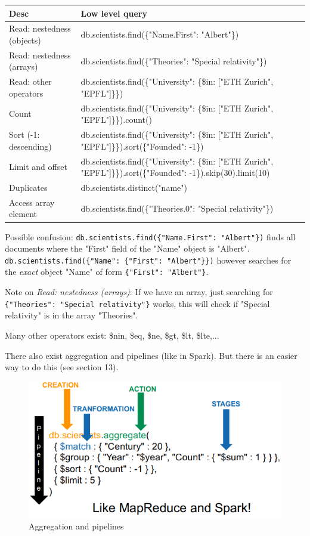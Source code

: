 \documentclass[11pt,oneside,a4paper]{article}
\begin{document}
\begin{table}[hb!]
\centering
\begin{tabular}{|p{40mm}|p{135mm}|}
	\hline 
	\textbf{Desc} & \textbf{Low level query} \\ 
	\hline 
	Read: nestedness (objects) & db.scientists.find(\{"Name.First": "Albert"\}) \\ 
	\hline 
	Read: nestedness (arrays) & db.scientists.find(\{"Theories": "Special relativity"\}) \\ 
	\hline 
	Read: other operators & db.scientists.find(\{"University": \{\$in: ["ETH Zurich", "EPFL"]\}\}) \\ 
	\hline 
	Count & db.scientists.find(\{"University": \{\$in: ["ETH Zurich", "EPFL"]\}\}).count() \\ 
	\hline 
	Sort (-1: descending) & db.scientists.find(\{"University": \{\$in: ["ETH Zurich", "EPFL"]\}\}).sort(\{"Founded": -1\}) \\ 
	\hline 
	Limit and offset & db.scientists.find(\{"University": \{\$in: ["ETH Zurich", "EPFL"]\}\}).sort(\{"Founded": -1\}).skip(30).limit(10) \\ 
	\hline 
	Duplicates & db.scientists.distinct("name") \\ 
	\hline 
	Access array element & db.scientists.find(\{"Theories.0": "Special relativity"\}) \\
	\hline
\end{tabular} 
\end{table}

Possible confusion: \texttt{db.scientists.find(\{"Name.First": "Albert"\})} finds all documents where the "First" field of the "Name" object is "Albert". \texttt{db.scientists.find(\{"Name": \{"First": "Albert"\}\})} however searches for the \textit{exact} object "Name" of form \texttt{\{"First": "Albert"\}}.

Note on \textit{Read: nestedness (arrays)}: If we have an array, just searching for \texttt{\{"Theories": "Special relativity"\}} works, this will check if "Special relativity" is in the array "Theories".

Many other operators exist: \$nin, \$eq, \$ne, \$gt, \$lt, \$lte,...

There also exist aggregation and pipelines (like in Spark). But there is an easier way to do this (see section 13).

\begin{figure}[b!]
	\centering
	\includegraphics[width=0.4\linewidth]{figures/docstores_aggregation_pipeline}
	\caption{Aggregation and pipelines}
	\label{fig:docstoresaggregationpipeline}
\end{figure}
\end{document}
